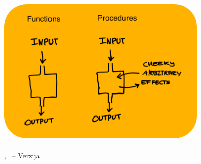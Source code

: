 \begin{titlepage}
    \begin{addmargin}[-1cm]{-3cm}
    \begin{center}
        \large

        \hfill

        \vfill

        \begingroup
            \color{Maroon}\spacedallcaps{\myTitle} \\ \bigskip
        \endgroup

        \spacedlowsmallcaps{\myAuthors}

        \vfill

        \includegraphics[width=10cm]{ext/frontpage2.png} \\ %
		\vfill %
        \mySubtitle \\ %
        \vfill %
        \myMonth, \myYear\ -- Verzija \myVersion

        \vfill

    \end{center}
  \end{addmargin}
\end{titlepage}

